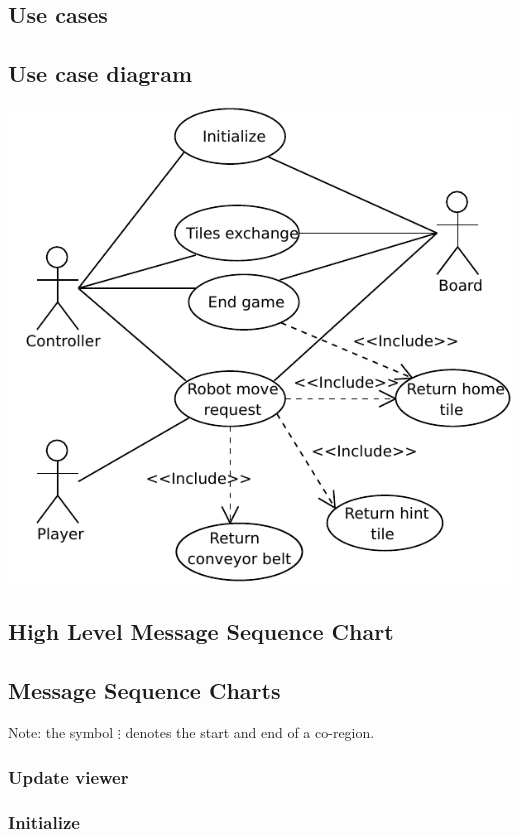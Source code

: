 \subsection{Use cases}
	
\subsection{Use case diagram}
	\includegraphics[width=\linewidth]{usecases/diagram.pdf}	

\subsection{High Level Message Sequence Chart}
    
	
\subsection{Message Sequence Charts}
	Note: the symbol $\vdots$ denotes the start and end of a co-region.

    \subsubsection{Update viewer}
    

	\subsubsection{Initialize}
  	
    	
